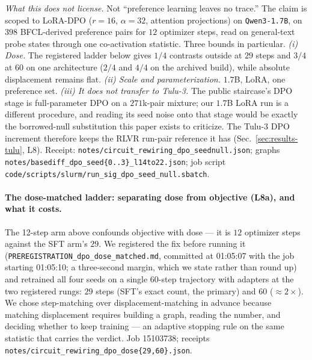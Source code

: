 \documentclass{article}
\begin{document}
\emph{What this does not license.} Not ``preference learning leaves no trace.'' The claim is scoped to LoRA-DPO ($r{=}16$, $\alpha{=}32$, attention projections) on \texttt{Qwen3-1.7B}, on $398$ BFCL-derived preference pairs for $12$ optimizer steps, read on general-text probe states through one co-activation statistic. Three bounds in particular. \emph{(i) Dose.} The registered ladder below gives $1/4$ contrasts outside at $29$ steps and $3/4$ at $60$ on one architecture ($2/4$ and $4/4$ on the archived build), while absolute displacement remains flat. \emph{(ii) Scale and parameterization.} $1.7$B, LoRA, one preference set. \emph{(iii) It does not transfer to Tulu-3.} The public staircase's DPO stage is full-parameter DPO on a $271$k-pair mixture; our $1.7$B LoRA run is a different procedure, and reading its seed noise onto that stage would be exactly the borrowed-null substitution this paper exists to criticize. The Tulu-3 DPO increment therefore keeps the RLVR run-pair reference it has (Sec.~\ref{sec:results-tulu}, L8). Receipt: \texttt{notes/circuit\_rewiring\_dpo\_seednull.json}; graphs \texttt{notes/basediff\_dpo\_seed\{0..3\}\_l14to22.json}; job script \texttt{code/scripts/slurm/run\_sig\_dpo\_seed\_null.sbatch}.

\paragraph{The dose-matched ladder: separating dose from objective (L8a), and what it costs.} The 12-step arm above confounds objective with dose --- it is $12$ optimizer steps against the SFT arm's $29$. We registered the fix before running it (\texttt{PREREGISTRATION\_dpo\_dose\_matched.md}, committed at 01:05:07 with the job starting 01:05:10; a three-second margin, which we state rather than round up) and retrained all four seeds on a single $60$-step trajectory with adapters at the two registered rungs: $29$ steps (SFT's exact count, the primary) and $60$ ($\approx2\times$). We chose step-matching over displacement-matching in advance because matching displacement requires building a graph, reading the number, and deciding whether to keep training --- an adaptive stopping rule on the same statistic that carries the verdict. Job 15103738; receipts \texttt{notes/circuit\_rewiring\_dpo\_dose\{29,60\}.json}.
\end{document}
